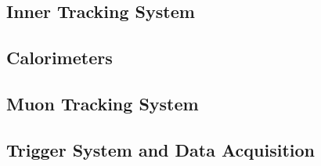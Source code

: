 \subsection{Inner Tracking System}
\label{subsec:tracking}

\subsection{Calorimeters}
\label{subsec:calorimeter}

\subsection{Muon Tracking System}
\label{subsec:muonTrack}

\subsection{Trigger System and Data Acquisition}
\label{subsec:trigger}
